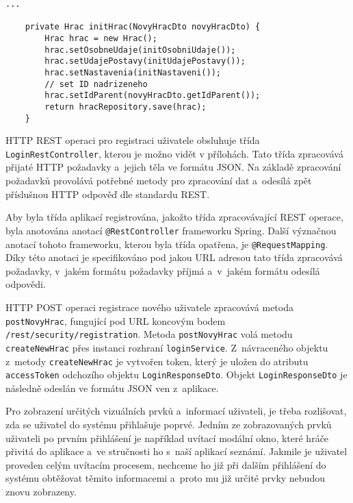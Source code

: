 \documentclass[twoside, 12pt]{article}
\begin{document}
{\begin{lstlisting}
...

    private Hrac initHrac(NovyHracDto novyHracDto) {
        Hrac hrac = new Hrac();
        hrac.setOsobneUdaje(initOsobniUdaje());
        hrac.setUdajePostavy(initUdajePostavy());
        hrac.setNastavenia(initNastaveni());
        // set ID nadrizeneho
        hrac.setIdParent(novyHracDto.getIdParent());
        return hracRepository.save(hrac);
    }
\end{lstlisting}

\vspace{10}

HTTP REST operaci pro registraci uživatele obsluhuje třída \texttt{LoginRestController},
kterou je možno vidět v přílohách.
Tato třída zpracovává přijaté HTTP požadavky a~jejich těla ve formátu JSON.
Na základě zpracování požadavků provolává potřebné metody pro zpracování dat
a~odesílá zpět příslušnou HTTP odpověď dle standardu REST.

Aby byla třída aplikací registrována, jakožto třída zpracovávající REST operace,
byla anotována anotací \texttt{@RestController} frameworku Spring.
Další význačnou anotací tohoto frameworku, kterou byla třída opatřena, je \texttt{@RequestMapping}.
Díky této anotaci je specifikováno pod jakou URL adresou tato třída zpracovává požadavky,
v~jakém formátu požadavky příjmá a~v~jakém formátu odesílá odpovědi.

HTTP POST operaci registrace nového uživatele zpracovává metoda \texttt{postNovyHrac},
fungující pod URL koncovým bodem \texttt{/rest/security/registration}.
Metoda \texttt{postNovyHrac} volá metodu \texttt{createNewHrac} přes instanci rozhraní \texttt{loginService}.
Z~návraceného objektu z~metody \texttt{createNewHrac} je vytvořen token,
který je uložen do atributu \texttt{accessToken} odchozího objektu \texttt{LoginResponseDto}.
Objekt \texttt{LoginResponseDto} je následně odeslán ve formátu JSON ven z~aplikace.

\clearpage


Pro zobrazení určitých vizuálních prvků a~informací uživateli, je třeba rozlišovat,
zda se uživatel do systému přihlašuje poprvé. Jedním ze zobrazovaných prvků uživateli po prvním přihlášení je například uvítací modální okno,
které hráče přivitá do aplikace a~ve stručnosti ho s~naší aplikací seznámí.
Jakmile je uživatel proveden celým uvítacím procesem, nechceme ho již při dalším přihlášení do systému
obtěžovat těmito informacemi a~proto mu již určité prvky nebudou znovu zobrazeny.

}
\end{document}
